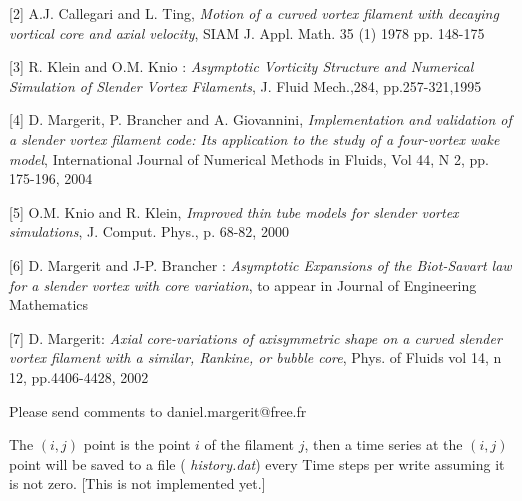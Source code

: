 [2] A.J. Callegari and L. Ting, {\it Motion of a curved vortex filament with decaying vortical core and axial velocity}, SIAM J. Appl. Math. 35 (1) 1978 pp. 148-175

[3]  R. Klein and O.M. Knio : {\it Asymptotic Vorticity Structure and Numerical Simulation of Slender Vortex Filaments}, J. Fluid Mech.,284, pp.257-321,1995 

[4] D. Margerit, P. Brancher and A. Giovannini, {\it Implementation and validation of a slender vortex filament code: Its application to the study of a four-vortex wake model}, International Journal of Numerical Methods in Fluids, Vol 44, N 2, pp. 175-196, 2004

[5] O.M. Knio and R. Klein, {\it Improved thin tube models for slender vortex simulations}, J. Comput. Phys., p. 68-82, 2000 

[6] D. Margerit and  J-P. Brancher : {\it Asymptotic Expansions of the Biot-Savart law for a slender vortex with core variation}, to appear in Journal of Engineering Mathematics

[7] D. Margerit: {\it Axial core-variations of axisymmetric shape on a curved slender vortex filament with a similar, Rankine, or bubble
core}, Phys. of Fluids vol 14, n 12, pp.4406-4428, 2002

Please send comments to daniel.margerit@free.fr


 


The $(i,j)$ point is the point $i$ of the filament $j$, then a time series at the
$(i,j)$ point will be saved to a file ({\em
history.dat}) every {\sf Time steps per write} assuming it is not zero.  [This is not implemented yet.]  